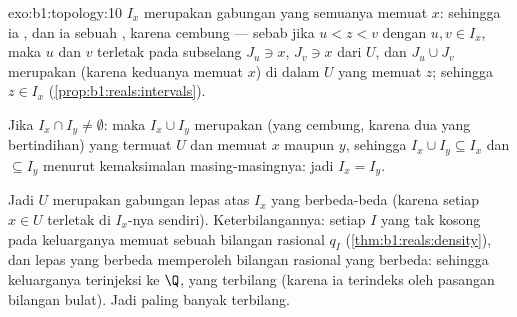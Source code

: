 \begin{solution}{exo:b1:topology:10}
 $I_x$ merupakan gabungan   yang semuanya memuat $x$: sehingga ia ,
dan ia sebuah , karena cembung --- sebab jika $u < z < v$ dengan $u, v \in
I_x$, maka $u$ dan $v$ terletak pada subselang  $J_u \ni x$, $J_v \ni
x$ dari $U$, dan $J_u \cup J_v$ merupakan  (karena keduanya memuat $x$)
di dalam $U$ yang memuat $z$; sehingga $z \in I_x$
(\cref{prop:b1:reals:intervals}).

Jika $I_x \cap I_y \neq \emptyset$: maka $I_x \cup I_y$ merupakan 
 (yang cembung, karena dua  yang bertindihan) yang termuat $U$
dan memuat $x$ maupun $y$, sehingga $I_x \cup I_y \subseteq I_x$ dan
$\subseteq I_y$ menurut kemaksimalan masing-masingnya: jadi $I_x = I_y$.

Jadi $U$ merupakan gabungan lepas atas  $I_x$ yang berbeda-beda (karena setiap $x \in
U$ terletak di $I_x$-nya sendiri). Keterbilangannya: setiap  
$I$ yang tak kosong pada keluarganya memuat sebuah bilangan rasional $q_I$
(\cref{thm:b1:reals:density}), dan  lepas yang berbeda memperoleh
bilangan rasional yang berbeda: sehingga keluarganya terinjeksi ke $\Q$, yang terbilang
(karena ia terindeks oleh pasangan bilangan bulat). Jadi  paling banyak
terbilang.
\end{solution}

